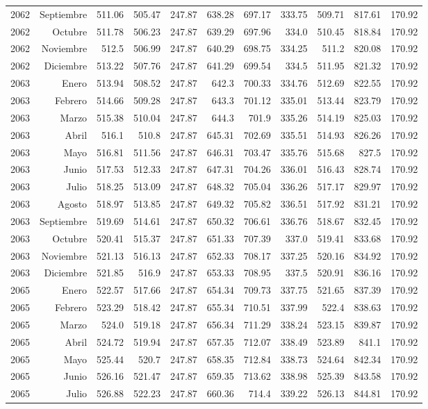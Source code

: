 \documentclass{article}%
\begin{document}
\begin{longtable}{|l r|r|r|r|r|r|r|r|r|r|}
2062&Septiembre&511.06&505.47&247.87&638.28&697.17&333.75&509.71&817.61&170.92\\%
2062&Octubre&511.78&506.23&247.87&639.29&697.96&334.0&510.45&818.84&170.92\\%
2062&Noviembre&512.5&506.99&247.87&640.29&698.75&334.25&511.2&820.08&170.92\\%
2062&Diciembre&513.22&507.76&247.87&641.29&699.54&334.5&511.95&821.32&170.92\\%
2063&Enero&513.94&508.52&247.87&642.3&700.33&334.76&512.69&822.55&170.92\\%
2063&Febrero&514.66&509.28&247.87&643.3&701.12&335.01&513.44&823.79&170.92\\%
2063&Marzo&515.38&510.04&247.87&644.3&701.9&335.26&514.19&825.03&170.92\\%
2063&Abril&516.1&510.8&247.87&645.31&702.69&335.51&514.93&826.26&170.92\\%
2063&Mayo&516.81&511.56&247.87&646.31&703.47&335.76&515.68&827.5&170.92\\%
2063&Junio&517.53&512.33&247.87&647.31&704.26&336.01&516.43&828.74&170.92\\%
2063&Julio&518.25&513.09&247.87&648.32&705.04&336.26&517.17&829.97&170.92\\%
2063&Agosto&518.97&513.85&247.87&649.32&705.82&336.51&517.92&831.21&170.92\\%
2063&Septiembre&519.69&514.61&247.87&650.32&706.61&336.76&518.67&832.45&170.92\\%
2063&Octubre&520.41&515.37&247.87&651.33&707.39&337.0&519.41&833.68&170.92\\%
2063&Noviembre&521.13&516.13&247.87&652.33&708.17&337.25&520.16&834.92&170.92\\%
2063&Diciembre&521.85&516.9&247.87&653.33&708.95&337.5&520.91&836.16&170.92\\%
2065&Enero&522.57&517.66&247.87&654.34&709.73&337.75&521.65&837.39&170.92\\%
2065&Febrero&523.29&518.42&247.87&655.34&710.51&337.99&522.4&838.63&170.92\\%
2065&Marzo&524.0&519.18&247.87&656.34&711.29&338.24&523.15&839.87&170.92\\%
2065&Abril&524.72&519.94&247.87&657.35&712.07&338.49&523.89&841.1&170.92\\%
2065&Mayo&525.44&520.7&247.87&658.35&712.84&338.73&524.64&842.34&170.92\\%
2065&Junio&526.16&521.47&247.87&659.35&713.62&338.98&525.39&843.58&170.92\\%
2065&Julio&526.88&522.23&247.87&660.36&714.4&339.22&526.13&844.81&170.92\\%
\hline%
\end{longtable}

%
\end{document}
